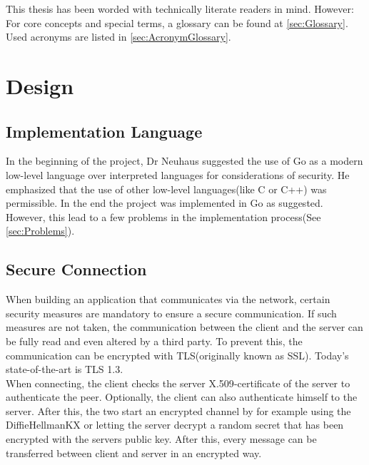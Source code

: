 \documentclass[10pt,a4paper,titlepage,twoside,english,final]{zhawreprt}
\begin{document}
\vspace{1.5cm}
This thesis has been worded with technically literate readers in mind. However: For core concepts and special terms, a glossary can be found at \ref{sec:Glossary}. Used acronyms are listed in \ref{sec:AcronymGlossary}.

\chapter{Design}\label{chp:Design}
\section{Implementation Language}\label{sec:DesignImplementationLanguage}
In the beginning of the project, Dr Neuhaus suggested the use of \gls{Go} as a modern low-level language over interpreted languages for considerations of security. He emphasized that the use of other low-level languages(like \gls{C} or \gls{C++}) was permissible. In the end the project was implemented in \gls{Go} as suggested.\\
However, this lead to a few problems in the implementation process(See \ref{sec:Problems}).

\section{Secure Connection}\label{sec:DesignSecureConnection}
When building an application that communicates via the network, certain security measures are mandatory to ensure a secure communication. If such measures are not taken, the communication between the client and the server can be fully read and even altered by a third party. To prevent this, the communication can be encrypted with \gls{TLS}(originally known as \gls{SSL}). Today's state-of-the-art is \gls{TLS} 1.3\citep{rfc8446}.\\
When connecting, the client checks the server \gls{X.509}-certificate of the server to authenticate the peer. Optionally, the client can also authenticate himself to the server. After this, the two start an encrypted channel by for example using the \gls{DiffieHellmanKX} or letting the server decrypt a random secret that has been encrypted with the servers public key. After this, every message can be transferred between client and server in an encrypted way.
\end{document}
